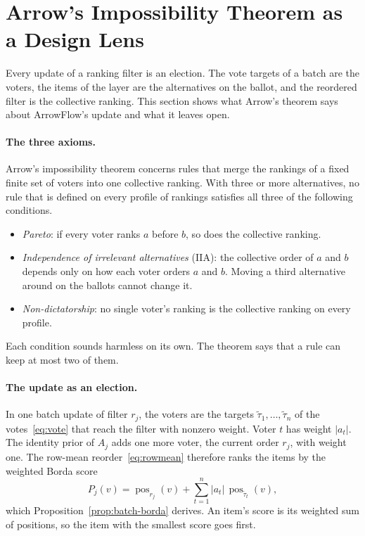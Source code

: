 \section{Arrow's Impossibility Theorem as a Design Lens}\label{sec:arrow}

Every update of a ranking filter is an election. The vote targets of a batch are the voters, the items of the layer are the alternatives on the ballot, and the reordered filter is the collective ranking. This section shows what Arrow's theorem says about ArrowFlow's update and what it leaves open.

\paragraph{The three axioms.}
Arrow's impossibility theorem \citep{arrow1951social,arrow1963social} concerns rules that merge the rankings of a fixed finite set of voters into one collective ranking. With three or more alternatives, no rule that is defined on every profile of rankings satisfies all three of the following conditions.
\begin{itemize}[leftmargin=2em,topsep=2pt,itemsep=1pt]
  \item \emph{Pareto}: if every voter ranks $a$ before $b$, so does the collective ranking.
  \item \emph{Independence of irrelevant alternatives} (IIA): the collective order of $a$ and $b$ depends only on how each voter orders $a$ and $b$. Moving a third alternative around on the ballots cannot change it.
  \item \emph{Non-dictatorship}: no single voter's ranking is the collective ranking on every profile.
\end{itemize}
Each condition sounds harmless on its own. The theorem says that a rule can keep at most two of them.

\paragraph{The update as an election.}
In one batch update of filter $r_j$, the voters are the targets $\tilde\tau_1,\dots,\tilde\tau_n$ of the votes~\eqref{eq:vote} that reach the filter with nonzero weight. Voter $t$ has weight $|a_t|$. The identity prior of $A_j$ adds one more voter, the current order $r_j$, with weight one. The row-mean reorder~\eqref{eq:rowmean} therefore ranks the items by the weighted Borda score
\begin{equation}\label{eq:borda-update}
P_j(v)=\operatorname{pos}_{r_j}(v)+\sum_{t=1}^{n} |a_t|\,\operatorname{pos}_{\tilde\tau_t}(v),
\end{equation}
which Proposition~\ref{prop:batch-borda} derives. An item's score is its weighted sum of positions, so the item with the smallest score goes first.

